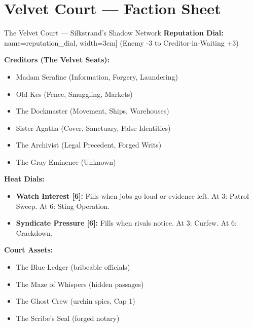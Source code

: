 \documentclass[10pt]{article}
\newcommand{\tf}[1]{\TextField[#1]{}}
\begin{document}
\newpage
\section*{Velvet Court --- Faction Sheet}

\begin{Form}

\begin{tipbox}{The Velvet Court --- Silkstrand's Shadow Network}
    \textbf{Reputation Dial:} \tf[name=reputation_dial, width=3cm]{} (Enemy -3 to Creditor-in-Waiting +3)
    
    \textbf{Creditors (The Velvet Seats):}
    \begin{itemize}
        \item Madam Serafine (Information, Forgery, Laundering)
        \item Old Kes (Fence, Smuggling, Markets)
        \item The Dockmaster (Movement, Ships, Warehouses)
        \item Sister Agatha (Cover, Sanctuary, False Identities)
        \item The Archivist (Legal Precedent, Forged Writs)
        \item The Gray Eminence (Unknown)
    \end{itemize}
    
    \textbf{Heat Dials:}
    \begin{itemize}
        \item \textbf{Watch Interest [6]:} Fills when jobs go loud or evidence left. At 3: Patrol Sweep. At 6: Sting Operation.
        \item \textbf{Syndicate Pressure [6]:} Fills when rivals notice. At 3: Curfew. At 6: Crackdown.
    \end{itemize}
    
    \textbf{Court Assets:}
    \begin{itemize}
        \item The Blue Ledger (bribeable officials)
        \item The Maze of Whispers (hidden passages)
        \item The Ghost Crew (urchin spies, Cap 1)
        \item The Scribe's Seal (forged notary)
    \end{itemize}
\end{tipbox}


\end{Form}
\end{document}
